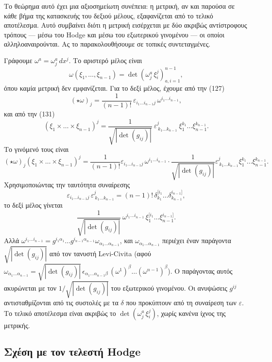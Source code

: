 \documentclass[12pt]{article}
\begin{document}
Το θεώρημα αυτό έχει μια αξιοσημείωτη συνέπεια: η μετρική, αν και παρούσα σε κάθε βήμα της κατασκευής του δεξιού μέλους, εξαφανίζεται από το τελικό αποτέλεσμα. Αυτό συμβαίνει διότι η μετρική εισέρχεται με δύο ακριβώς αντίστροφους τρόπους — μέσω του Hodge και μέσω του εξωτερικού γινομένου — οι οποίοι αλληλοαναιρούνται. Ας το παρακολουθήσουμε σε τοπικές συντεταγμένες.

Γράφουμε $\omega^a = \omega^a_j \, dx^j$. Το αριστερό μέλος είναι
\[
\omega(\xi_1, \dots, \xi_{n-1}) = \det \left( \omega^a_j \, \xi_i^j \right)_{a,i=1}^{n-1},
\]
όπου καμία μετρική δεν εμφανίζεται. Για το δεξί μέλος, έχουμε από την (127)
\[
(\star \omega)_j = \frac{1}{(n-1)!} \, \varepsilon_{i_1 \dots i_{n-1} j} \, \omega^{i_1 \dots i_{n-1}},
\]
και από την (131)
\[
(\xi_1 \times \dots \times \xi_{n-1})^j = \frac{1}{\sqrt{|\det(g_{ij})|}} \ \varepsilon^{j}_{\ k_1 \dots k_{n-1}} \ \xi_1^{k_1} \dots \xi_{n-1}^{k_{n-1}}.
\]
Το γινόμενό τους είναι
\[
(\star \omega)_j (\xi_1 \times \dots \times \xi_{n-1})^j = \frac{1}{(n-1)!} \varepsilon_{i_1 \dots i_{n-1} j} \, \omega^{i_1 \dots i_{n-1}} \cdot \frac{1}{\sqrt{|\det(g_{ij})|}} \varepsilon^{j}_{\ k_1 \dots k_{n-1}} \xi_1^{k_1} \dots \xi_{n-1}^{k_{n-1}}.
\]
Χρησιμοποιώντας την ταυτότητα συναίρεσης
\[
\varepsilon_{i_1 \dots i_{n-1} j} \, \varepsilon^{j}_{\ k_1 \dots k_{n-1}} = (n-1)! \, \delta^{[i_1}_{k_1} \dots \delta^{i_{n-1}]}_{k_{n-1}},
\]
το δεξί μέλος γίνεται
\[
\frac{1}{\sqrt{|\det(g_{ij})|}} \ \omega^{i_1 \dots i_{n-1}} \, \xi_1^{[i_1} \dots \xi_{n-1}^{i_{n-1}]}.
\]
Αλλά $\omega^{i_1 \dots i_{n-1}} = g^{i_1 \alpha_1} \dots g^{i_{n-1} \alpha_{n-1}} \omega_{\alpha_1 \dots \alpha_{n-1}}$, και $\omega_{\alpha_1 \dots \alpha_{n-1}}$ περιέχει έναν παράγοντα $\sqrt{|\det(g_{ij})|}$ από τον τανυστή Levi-Civita (αφού $\omega_{\alpha_1 \dots \alpha_{n-1}} = \sqrt{|\det(g_{ij})|} \, \epsilon_{\alpha_1 \dots \alpha_{n-1} \beta} \, (\omega^1)^\beta \dots (\omega^{n-1})^\beta$). Ο παράγοντας αυτός ακυρώνεται με τον $1/\sqrt{|\det(g_{ij})|}$ του εξωτερικού γινομένου. Οι ανυψώσεις $g^{ij}$ αντισταθμίζονται από τις συστολές με τα $\delta$ που προκύπτουν από τη συναίρεση των $\varepsilon$. Το τελικό αποτέλεσμα είναι ακριβώς το $\det(\omega^a_j \, \xi_i^j)$, χωρίς κανένα ίχνος της μετρικής.

\subsection{Σχέση με τον τελεστή Hodge}
\end{document}
